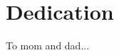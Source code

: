 \chapter*{Dedication}\label{ch:dedication}











                            To mom and dad...


